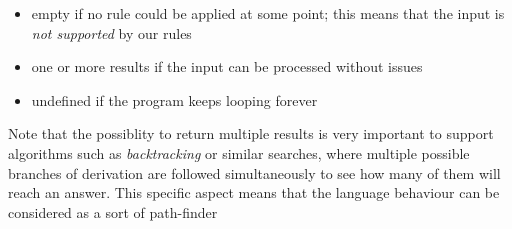 \begin{itemize}
\item empty if no rule could be applied at some point; this means that the input is \textit{not supported} by our rules
\item one or more results if the input can be processed without issues
\item undefined if the program keeps looping forever
\end{itemize}

Note that the possiblity to return multiple results is very important to support algorithms such as \textit{backtracking} or similar searches, where multiple possible branches of derivation are followed simultaneously to see how many of them will reach an answer. This specific aspect means that the language behaviour can be considered as a sort of path-finder
